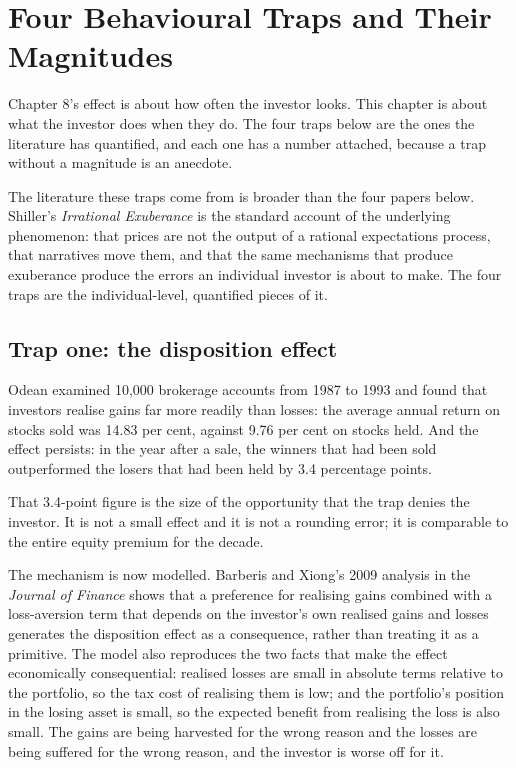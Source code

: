
\chapter{Four Behavioural Traps and Their Magnitudes}
\label{ch:behaviour}

Chapter 8's effect is about how often the investor looks. This chapter is
about what the investor does when they do. The four traps below are the
ones the literature has quantified, and each one has a number attached,
because a trap without a magnitude is an anecdote.

The literature these traps come from is broader than the four papers
below. Shiller's \emph{Irrational Exuberance} is the standard account of
the underlying phenomenon: that prices are not the output of a rational
expectations process, that narratives move them, and that the same
mechanisms that produce exuberance produce the errors an individual
investor is about to make. The four traps are the individual-level,
quantified pieces of it.

\section{Trap one: the disposition effect}

Odean examined 10,000 brokerage accounts from 1987 to 1993 and found that
investors realise gains far more readily than losses: the average annual
return on stocks sold was 14.83 per cent, against 9.76 per cent on stocks
held. And the effect persists: in the year after a sale, the winners that
had been sold outperformed the losers that had been held by 3.4 percentage
points.

That 3.4-point figure is the size of the opportunity that the trap denies
the investor. It is not a small effect and it is not a rounding error; it
is comparable to the entire equity premium for the decade.

The mechanism is now modelled. Barberis and Xiong's 2009 analysis in the
\emph{Journal of Finance} shows that a preference for realising gains
combined with a loss-aversion term that depends on the investor's own
realised gains and losses generates the disposition effect as a consequence,
rather than treating it as a primitive. The model also reproduces the two
facts that make the effect economically consequential: realised losses are
small in absolute terms relative to the portfolio, so the tax cost of
realising them is low; and the portfolio's position in the losing asset is
small, so the expected benefit from realising the loss is also small. The
gains are being harvested for the wrong reason and the losses are being
suffered for the wrong reason, and the investor is worse off for it.

